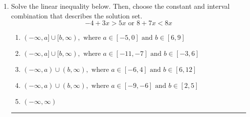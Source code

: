 \documentclass[14pt]{extbook}
\newcommand{\litem}[1]{\item#1\hspace*{-1cm}\rule{\textwidth}{0.4pt}}
\begin{document}
\begin{enumerate}
{\begin{enumerate}[label=\Alph*.]
\end{enumerate} }
\litem{
Solve the linear inequality below. Then, choose the constant and interval combination that describes the solution set.\[ -4 + 3 x > 5 x \text{ or } 8 + 7 x < 8 x \]\begin{enumerate}[label=\Alph*.]
\item \( (-\infty, a] \cup [b, \infty), \text{ where } a \in [-5, 0] \text{ and } b \in [6, 9] \)
\item \( (-\infty, a] \cup [b, \infty), \text{ where } a \in [-11, -7] \text{ and } b \in [-3, 6] \)
\item \( (-\infty, a) \cup (b, \infty), \text{ where } a \in [-6, 4] \text{ and } b \in [6, 12] \)
\item \( (-\infty, a) \cup (b, \infty), \text{ where } a \in [-9, -6] \text{ and } b \in [2, 5] \)
\item \( (-\infty, \infty) \)

\end{enumerate} }
\end{enumerate}
\end{document}
